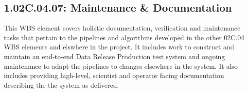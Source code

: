 \subsection{1.02C.04.07: Maintenance \& Documentation}

This WBS element covers holistic documentation, verification and
maintenance tasks that pertain to the pipelines and algorithms developed
in the other 02C.04 WBS elements and elswhere in the project. It
includes work to construct and maintain an end-to-end Data Release
Production test system and ongoing maintenance to adapt the pipelines to
changes elsewhere in the system. It also includes providing high-level,
scientist and operator facing documentation describing the the system as
delivered.
